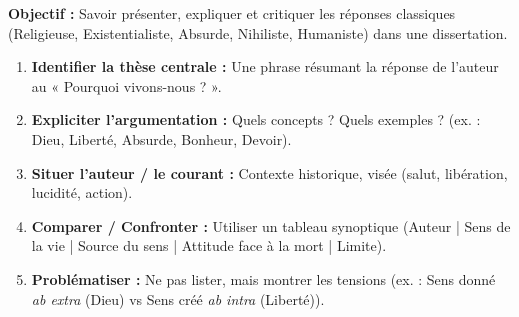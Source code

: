 \documentclass[11pt]{article}
\begin{document}
\begin{methode}
\textbf{Objectif :} Savoir présenter, expliquer et critiquer les réponses classiques (Religieuse, Existentialiste, Absurde, Nihiliste, Humaniste) dans une dissertation.
\begin{enumerate}
    \item \textbf{Identifier la thèse centrale :} Une phrase résumant la réponse de l'auteur au « Pourquoi vivons-nous ? ».
    \item \textbf{Expliciter l'argumentation :} Quels concepts ? Quels exemples ? (ex. : Dieu, Liberté, Absurde, Bonheur, Devoir).
    \item \textbf{Situer l'auteur / le courant :} Contexte historique, visée (salut, libération, lucidité, action).
    \item \textbf{Comparer / Confronter :} Utiliser un tableau synoptique (Auteur | Sens de la vie | Source du sens | Attitude face à la mort | Limite).
    \item \textbf{Problématiser :} Ne pas lister, mais montrer les tensions (ex. : Sens donné \emph{ab extra} (Dieu) vs Sens créé \emph{ab intra} (Liberté)).
\end{enumerate}
\end{methode}
\end{document}
